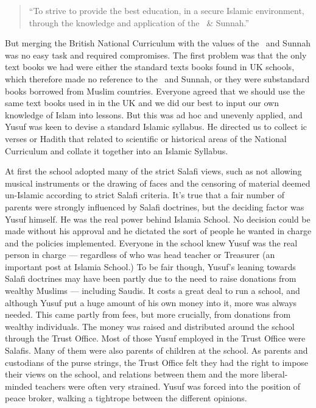 \documentclass[12pt]{memoir}
\begin{document}
\begin{quote}
“To strive to provide the best education, in a secure Islamic environment,
through the knowledge and application of the \Quran\ \& Sunnah.”
\end{quote}

But merging the British National Curriculum with the values of
the \Quran\ and Sunnah was no easy task and required compromises.
The first problem was that the only text books we had were either
the standard texts books found in UK schools,
which therefore made no reference to the \Quran\ and Sunnah,
or they were sub\–standard books borrowed from Muslim countries.
Everyone agreed that we should use the same text books
used in  in the UK and we did our best
to input our own knowledge of Islam into lessons.
But this was ad hoc and unevenly applied,
and Yusuf was keen to devise a standard Islamic syllabus.
He directed us to collect \Quran{}ic verses or Hadith
that related to scientific or historical areas of the National Curriculum
and collate it together into an Islamic Syllabus.

At first the school adopted many of the strict Salafi views,
such as not allowing musical instruments or the drawing of faces
and the censoring of material deemed un-Islamic
according to strict Salafi criteria.
It’s true that a fair number of parents were strongly influenced
by Salafi doctrines, but the deciding factor was Yusuf himself.
He was the real power behind Islamia School.
No decision could be made without his approval and he dictated
the sort of people he wanted in charge and the policies implemented.
Everyone in the school knew Yusuf was the real person in charge —
regardless of who was head teacher or Treasurer
(an important post at Islamia School.)
To be fair though, Yusuf’s leaning towards Salafi doctrines
may have been partly due to the need
to raise donations from wealthy Muslims — including Saudis.
It costs a great deal to run a school,
and although Yusuf put a huge amount of his own money into it,
more was always needed.
This came partly from fees, but more crucially,
from donations from wealthy individuals.
The money was raised and distributed around the school
through the Trust Office.
Most of those Yusuf employed in the Trust Office were Salafis.
Many of them were also parents of children at the school.
As parents and custodians of the purse strings,
the Trust Office felt they had the right to impose their views on the school,
and relations between them and the more liberal-minded teachers
were often very strained.
Yusuf was forced into the position of peace broker,
walking a tightrope between the different opinions.
\end{document}
